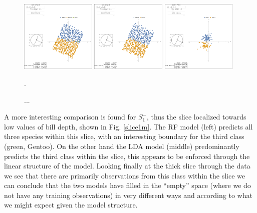 \documentclass[]{interact}
\theoremstyle{plain}%
\theoremstyle{definition}
\theoremstyle{remark}
\begin{document}
\begin{figure}[ht]
\centerline{\includegraphics[width=0.32\textwidth]{figures/slice1_p_rf.png}
\includegraphics[width=0.32\textwidth]{figures/slice1_p_lda.png}
\includegraphics[width=0.32\textwidth]{figures/slice1_p_data.png}}
\caption{...}.
\label{slice1p}
\end{figure}

A more interesting comparison is found for \(S_1^{-}\), thus the slice
localized towards low values of bill depth, shown in Fig. \ref{slice1m}.
The RF model (left) predicts all three species within this slice, with
an interesting boundary for the third class (green, Gentoo). On the
other hand the LDA model (middle) predominantly predicts the third class
within the slice, this appears to be enforced through the linear
structure of the model. Looking finally at the thick slice through the
data we see that there are primarily observations from this class within
the slice we can conclude that the two models have filled in the
``empty'' space (where we do not have any training observations) in very
different ways and according to what we might expect given the model
structure.
\end{document}
